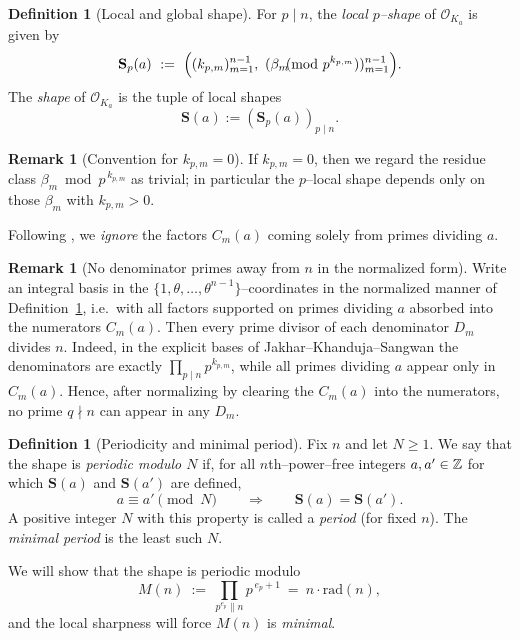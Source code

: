 \documentclass[12pt,a4paper,oneside]{amsart}
\theoremstyle{definition}
\newtheorem{definition}[theorem]{Definition}
\newtheorem{remark}[theorem]{Remark}
\begin{document}
\begin{definition}[Local and global shape]\label{def:shape}
For $p\mid n$, the \emph{local $p$–shape} of $\mathcal O_{K_a}$ is given by
\[
\mathbf S_p(a)\ :=\ \Bigl((k_{p,m})_{m=1}^{n-1},\ (\beta_m \!\!\!\!\pmod{p^{k_{p,m}}})_{m=1}^{n-1}\Bigr).
\]
The \emph{shape} of $\mathcal O_{K_a}$ is the tuple of local shapes 
\[
\mathbf S(a):=(\mathbf S_p(a))_{p\mid n}.
\]
\end{definition}

\begin{remark}[Convention for $k_{p,m}=0$]\label{rem:kpm0}
If $k_{p,m}=0$, then we regard the residue class $\beta_m\bmod p^{\,k_{p,m}}$ as trivial; in particular the $p$–local shape depends only on those $\beta_m$ with $k_{p,m}>0$.
\end{remark}

Following \cite{JKS21}, we \emph{ignore} the factors $C_m(a)$ coming solely from primes dividing $a$.

\begin{remark}[No denominator primes away from $n$ in the normalized form]\label{fact:denom}
Write an integral basis in the $\{1,\theta,\dots,\theta^{n-1}\}$–coordinates in the normalized manner of Definition~\ref{def:shape}, i.e.\ with all factors supported on primes dividing $a$ absorbed into the numerators $C_m(a)$. Then every prime divisor of each denominator $D_m$ divides $n$. Indeed, in the explicit bases of Jakhar--Khanduja--Sangwan the denominators are exactly $\prod_{p\mid n}p^{k_{p,m}}$, while all primes dividing $a$ appear only in $C_m(a)$. Hence, after normalizing by clearing the $C_m(a)$ into the numerators, no prime $q\nmid n$ can appear in any $D_m$. 
\end{remark}


\begin{definition}[Periodicity and minimal period]\label{def:periodicity}
Fix $n$ and let $N\ge1$. We say that the shape is \emph{periodic modulo $N$} if, for all
$n$th--power--free integers $a,a'\in\Bbb Z$ for which $\mathbf S(a)$ and $\mathbf S(a')$ are defined,
\[
a\equiv a'\pmod N\qquad\Longrightarrow\qquad \mathbf S(a)=\mathbf S(a').
\]
A positive integer $N$ with this property is called a \emph{period} (for fixed $n$). The \emph{minimal period}
is the least such $N$.
\end{definition}


We will show that the shape is periodic modulo
\begin{equation}\label{eq:Mn}
M(n)\ :=\ \prod_{p^{e_p}\parallel n} p^{\,e_p+1}\ =\ n\cdot\mathrm{rad}(n),
\end{equation}
and the local sharpness will force $M(n)$ is \emph{minimal}.
\end{document}
